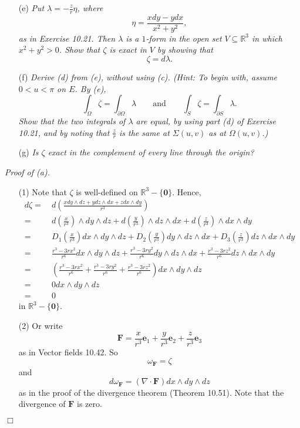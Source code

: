 \documentclass{article}
\begin{document}
\begin{enumerate}
\item[(e)]
  \emph{Put $\lambda = -\frac{z}{r}\eta$, where
  \[
    \eta = \frac{xdy-ydx}{x^2+y^2},
  \]
  as in Exercise 10.21.
  Then $\lambda$ is a $1$-form in the open set $V \subseteq \mathbb{R}^3$ in which $x^2+y^2 > 0$.
  Show that $\zeta$ is exact in $V$ by showing that
  \[
    \zeta = d\lambda.
  \]}
\item[(f)]
  \emph{Derive (d) from (e), without using (c).
  (Hint: To begin with, assume $0 < u < \pi$ on $E$.
  By (e),
  \[
    \int_{\Omega} \zeta = \int_{\partial\Omega} \lambda
    \qquad
    \text{and}
    \qquad
    \int_{S} \zeta = \int_{\partial S} \lambda.
  \]
  Show that the two integrals of $\lambda$ are equal,
  by using part (d) of Exercise 10.21,
  and by noting that $\frac{z}{r}$ is the same at $\Sigma(u,v)$ as at $\Omega(u,v)$.)}

\item[(g)]
  \emph{Is $\zeta$ exact in the complement of every line through the origin?} \\
\end{enumerate}



\emph{Proof of (a).}
\begin{enumerate}
\item[(1)]
  Note that $\zeta$ is well-defined on $\mathbb{R}^3 - \{ \mathbf{0} \}$.
  Hence,
  \begin{align*}
    d\zeta
    =& \: d\left( \frac{x dy \wedge dz + y dz \wedge dx + z dx \wedge dy}{r^3} \right) \\
    =& \: d\left(\frac{x}{r^3}\right) \wedge dy \wedge dz
      + d\left(\frac{y}{r^3}\right) \wedge dz \wedge dx
      + d\left(\frac{z}{r^3}\right) \wedge dx \wedge dy \\
    =& \: D_1\left(\frac{x}{r^3}\right) dx \wedge dy \wedge dz
      + D_2\left(\frac{y}{r^3}\right) dy \wedge dz \wedge dx
      + D_3\left(\frac{z}{r^3}\right) dz \wedge dx \wedge dy \\
    =& \: \frac{r^3 - 3rx^2}{r^6} dx \wedge dy \wedge dz
      + \frac{r^3 - 3ry^2}{r^6} dy \wedge dz \wedge dx
      + \frac{r^3 - 3rz^2}{r^6} dz \wedge dx \wedge dy \\
    =& \: \left(\frac{r^3 - 3rx^2}{r^6}
      + \frac{r^3 - 3ry^2}{r^6}
      + \frac{r^3 - 3rz^2}{r^6}\right) dx \wedge dy \wedge dz \\
    =& \: 0 dx \wedge dy \wedge dz \\
    =& \: 0
  \end{align*}
  in $\mathbb{R}^3 - \{ \mathbf{0} \}$.

\item[(2)]
  Or write
  \[
    \mathbf{F}
    = \frac{x}{r^3} \mathbf{e}_1 + \frac{y}{r^3} \mathbf{e}_2 + \frac{z}{r^3}  \mathbf{e}_3
  \]
  as in Vector fields 10.42.
  So
  \[
    \omega_{\mathbf{F}} = \zeta
  \]
  and
  \[
    d\omega_{\mathbf{F}}
    = (\nabla \cdot \mathbf{F}) dx \wedge dy \wedge dz
  \]
  as in the proof of the divergence theorem (Theorem 10.51).
  Note that the divergence of $\mathbf{F}$ is zero.
\end{enumerate}
$\Box$ \\
\end{document}

